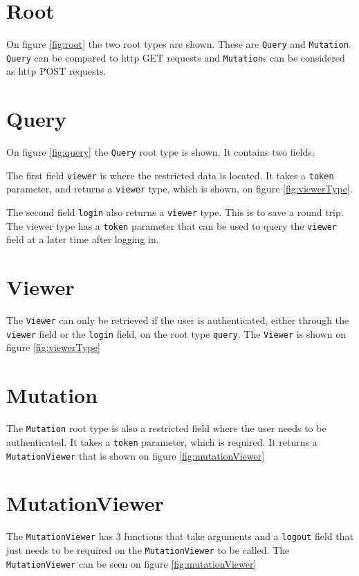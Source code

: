 \section{Root}
\label{sec:root}
On figure \ref{fig:root} the two root types are shown. 
These are \verb+Query+ and \verb+Mutation+. 
\verb+Query+ can be compared to \gls{http} GET requests and \verb+Mutation+s can be considered as \gls{http} POST requests.

\section{Query}
\label{sec:query}
On figure \ref{fig:query} the \verb+Query+ root type is shown. It contains two fields. 

The first field \verb+viewer+ is where the restricted data is located.
It takes a \verb+token+ parameter, and returns a \verb+viewer+ type, which is shown, on figure \ref{fig:viewerType}.

The second field \verb+login+ also returns a \verb+viewer+ type. 
This is to save a round trip.
The viewer type has a \verb+token+ parameter that can be used to query the \verb+viewer+ field at a later time after logging in.

\section{Viewer}
\label{sec:viewer}
The \verb+Viewer+ can only be retrieved if the user is authenticated, either through the \verb+viewer+ field or the \verb+login+ field, on the root type \verb+query+. The \verb+Viewer+ is shown on figure \ref{fig:viewerType}

\section{Mutation}
\label{sec:mutation}
The \verb+Mutation+ root type is also a restricted field where the user needs to be authenticated. 
It takes a \verb+token+ parameter, which is required. 
It returns a \verb+MutationViewer+ that is shown on figure \ref{fig:mutationViewer}

\section{MutationViewer}
The \verb+MutationViewer+ has 3 functions that take arguments and a \verb+logout+ field that just needs to be required on the \verb+MutationViewer+ to be called. The \verb+MutationViewer+ can be seen on figure \ref{fig:mutationViewer}

